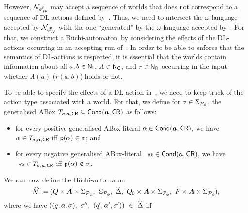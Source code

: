 However, $\mathcal{N}_{\phi^\mathsf{p}_\mathcal{W}}$ may accept a sequence of worlds that does not
correspond to a sequence of DL-actions defined by~\Nmc.  Thus, we need to
intersect the $\omega$-language accepted by $\mathcal{N}_{\phi^\mathsf{p}_\mathcal{W}}$ with the one
\enquote{generated} by the $\omega$-language accepted by~\Nmc.  For that, we
construct a Büchi-automaton~\Nmch by considering the effects of the DL-actions
occurring in an accepting run of~\Nmc.  In order to be able to enforce that the
semantics of DL-actions is respected, it is essential that the worlds contain
information about all $a,b\in\mathsf{N_I}$, $A\in\mathsf{N_C}$, and $r\in\mathsf{N_R}$ occurring in the
input whether $A(a)$ ($r(a,b)$) holds or not.

To be able to specify the effects of a DL-action in~\Nmch, we need to keep track
of the action type associated with a world.
%
For that, we define for $\sigma\in\Sigma_{\mathcal{P}_\phi}$, the generalised ABox
$T_{\sigma,\boldsymbol a,\mathsf{CR}}\subseteq\operatorname{\mathsf{Cond}}(\boldsymbol a,\mathsf{CR})$ as follows:
\begin{itemize}
    \item for every positive generalised ABox-literal
        $\alpha\in\operatorname{\mathsf{Cond}}(\boldsymbol a,\mathsf{CR})$, we have $\alpha\in T_{\sigma,\boldsymbol a,\mathsf{CR}}$ iff
        $\mathsf{p}(\alpha)\in\sigma$; and
    \item for every negative generalised ABox-literal
        $\lnot\alpha\in\operatorname{\mathsf{Cond}}(\boldsymbol a,\mathsf{CR})$, we have
        $\lnot\alpha\in T_{\sigma,\boldsymbol a,\mathsf{CR}}$ iff $\mathsf{p}(\alpha)\notin\sigma$.
\end{itemize}

\noindent
We can now define the Büchi-automaton
\[\Nmch:=(Q\times\Abf\times\Sigma_{\Pmc_\phi},\ \Sigma_{\Pmc_\phi},\
    \Deltah,\ Q_0\times\Abf\times\Sigma_{\Pmc_\phi},\
    F\times\Abf\times\Sigma_{\Pmc_\phi}),\]
where we have
$((q,\abf,\sigma),\ \sigma'',\ (q',\abf',\sigma'))\ \in\ \Deltah$ iff

